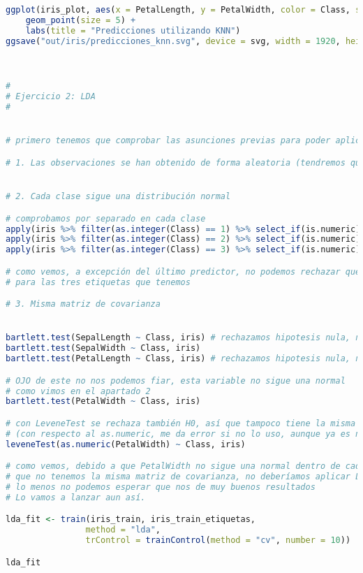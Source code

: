 \begin{lstlisting}[language=R]
ggplot(iris_plot, aes(x = PetalLength, y = PetalWidth, color = Class, shape = test)) +
	geom_point(size = 5) +
	labs(title = "Predicciones utilizando KNN")
ggsave("out/iris/predicciones_knn.svg", device = svg, width = 1920, height = 1080, units = "px", dpi = 150)



#
# Ejercicio 2: LDA
#


# primero tenemos que comprobar las asunciones previas para poder aplicar LDA

# 1. Las observaciones se han obtenido de forma aleatoria (tendremos que suponer que así ha sido)


# 2. Cada clase sigue una distribución normal

# comprobamos por separado en cada clase
apply(iris %>% filter(as.integer(Class) == 1) %>% select_if(is.numeric), 2, shapiro.test)
apply(iris %>% filter(as.integer(Class) == 2) %>% select_if(is.numeric), 2, shapiro.test)
apply(iris %>% filter(as.integer(Class) == 3) %>% select_if(is.numeric), 2, shapiro.test)

# como vemos, a excepción del último predictor, no podemos rechazar que siga una distribución normal
# para las tres etiquetas que tenemos

# 3. Misma matriz de covarianza


bartlett.test(SepalLength ~ Class, iris) # rechazamos hipotesis nula, no sigue la misma covarianza
bartlett.test(SepalWidth ~ Class, iris)
bartlett.test(PetalLength ~ Class, iris) # rechazamos hipotesis nula, no sigue la misma covarianza

# OJO de este no nos podemos fiar, esta variable no sigue una normal
# como vimos en el apartado 2
bartlett.test(PetalWidth ~ Class, iris)

# con LeveneTest se rechaza también H0, así que tampoco tiene la misma covarianza
# (con respecto al as.numeric, me da error si no lo uso, aunque ya es numerico, no se por que)
leveneTest(as.numeric(PetalWidth) ~ Class, iris)

# como vemos, debido a que PetalWidth no sigue una normal dentro de cada clase, y
# que no tenemos la misma matriz de covarianza, no deberíamos aplicar LDA, o por
# lo menos no podemos esperar que nos de muy buenos resultados
# Lo vamos a lanzar aun así.

lda_fit <- train(iris_train, iris_train_etiquetas,
				method = "lda",
				trControl = trainControl(method = "cv", number = 10))

lda_fit


\end{lstlisting}
